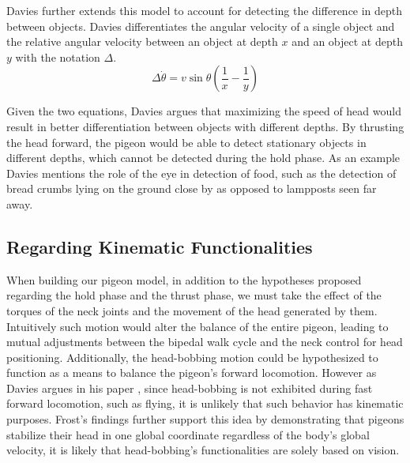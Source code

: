     Davies further extends this model to account for detecting the difference in depth between objects. Davies differentiates the angular velocity of a single object and the relative angular velocity between an object at depth $x$ and an object at depth $y$ with the notation $\Delta$.
    \begin{equation}
      \Delta \dot \theta = v \sin \theta \left( {\frac 1 x - \frac 1 y} \right)
    \end{equation}

    Given the two equations, Davies argues that maximizing the speed of head would result in better differentiation between objects with different depths. By thrusting the head forward, the pigeon would be able to detect stationary objects in different depths, which cannot be detected during the hold phase. As an example Davies mentions the role of the eye in detection of food, such as the detection of bread crumbs lying on the ground close by as opposed to lampposts seen far away.

\subsection{Regarding Kinematic Functionalities}
  When building our pigeon model, in addition to the hypotheses proposed regarding the hold phase and the thrust phase, we must take the effect of the torques of the neck joints and the movement of the head generated by them. Intuitively such motion would alter the balance of the entire pigeon, leading to mutual adjustments between the bipedal walk cycle and the neck control for head positioning. Additionally, the head-bobbing motion could be hypothesized to function as a means to balance the pigeon's forward locomotion. However as Davies argues in his paper \cite{davies1988head}, since head-bobbing is not exhibited during fast forward locomotion, such as flying, it is unlikely that such behavior has kinematic purposes. Frost's findings \cite{frost1978optokinetic} further support this idea by demonstrating that pigeons stabilize their head in one global coordinate regardless of the body's global velocity, it is likely that head-bobbing's functionalities are solely based on vision.
